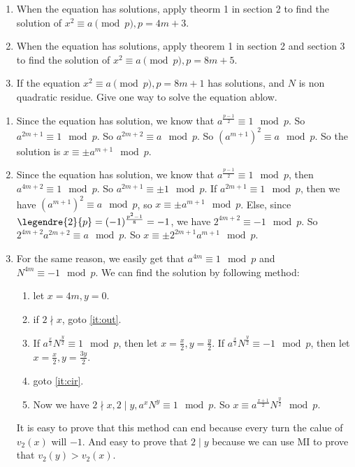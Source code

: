 \documentclass{ctexart}
\begin{document}
\begin{problem}\label{pro:2}
  \begin{enumerate}
    \item When the equation has solutions, apply theorm 1 in section 2 to
      find the solution of \(x^2 \equiv a \pmod{p}, p=4m + 3\).
    \item When the equation has solutions, apply theorem 1 in section 2 and section 3 to
      find the solution of \(x^2 \equiv a \pmod{p}, p=8m + 5\).
    \item If the equation \(x^2 \equiv a \pmod{p},p=8m + 1\) has solutions, and \(N \) is non quadratic residue.
      Give one way to solve the equation ablow.
  \end{enumerate}
\end{problem}
\begin{solution}
  \begin{enumerate}
    \item Since the equation has solution, we know that \(a^{\frac{p-1}{2}}\equiv 1 \mod p\).
      So \(a^{2m+1} \equiv 1 \mod p\). So \(a^{2m+2}\equiv a \mod p\).
      So \((a^{m+1})^2 \equiv a \mod p\). So the solution is \(x \equiv \pm a^{m+1} \mod p\).
    \item Since the equation has solution, we know that \(a^{\frac{p-1}{2}} \equiv 1 \mod p\), then \(a^{4m+2} \equiv 1 \mod p\).
      So \(a^{2m+1} \equiv \pm 1 \mod p\).
      If \(a^{2m+1}\equiv 1 \mod p\), then we have \((a^{m+1})^2 \equiv a \mod p\), so \(x \equiv \pm a^{m+1} \mod p\).
      Else, since \(\legendre{2}{p}=(-1)^{\frac{p^2-1}{8}}=-1\), we have \(2^{4m+2} \equiv -1 \mod p\).
      So \(2^{4m+2} a^{2m+2}\equiv a \mod p\). So \(x \equiv \pm 2^{2m+1}a^{m+1} \mod p\).
    \item For the same reason, we easily get that \(a^{4m} \equiv 1 \mod p\) and \(N^{4m} \equiv -1 \mod p\).
      We can find the solution by following method:
      \begin{enumerate}
        \item let \(x=4m,y=0\).
        \item \label{it:cir}if \(2 \nmid x\), goto \ref{it:out}.
        \item If \(a^{\frac{x}{2}}N^{\frac{y}{2}} \equiv 1 \mod p\), then let \(x=\frac{x}{2},y=\frac{y}{2}\).
          If \(a^{\frac{x}{2}}N^{\frac{y}{2}} \equiv -1 \mod p\), then let \(x=\frac{x}{2},y=\frac{3y}{2}\).
        \item goto \ref{it:cir}.
        \item \label{it:out} Now we have \(2 \nmid x,2 \mid y,a^x N^y \equiv 1 \mod p\).
          So \(x \equiv a^{\frac{x+1}{2}}N^{\frac{y}{2}} \mod p\).
      \end{enumerate}
      It is easy to prove that this method can end because every turn the calue of \(v_2(x)\) will \(-1\).
      And easy to prove that \(2 \mid y\) because we can use MI to prove that \(v_2(y)>v_2(x)\).
  \end{enumerate}
\end{solution}
\end{document}
